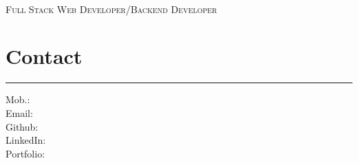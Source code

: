 \documentclass[]{rahulworld-resume}
\begin{document}
%
%

\begin{minipage}[t]{1\textwidth}
    \RaggedRight
    \begin{large}
    \end{large}\\
\textsc{Full Stack Web Developer/Backend Developer}


\end{minipage}

\begin{minipage}[t]{0.33\textwidth}



\vspace{5pt}
\section{Contact}
\noindent\rule{5cm}{0.4pt}

Mob.: \href{https://wa.me/573008163841}{}\\
Email: \textit{\href{mailto:janerrq@gmail.com}{}}\\
Github: \href{https://github.com/jamerrq}{} \\
LinkedIn: \href{https://www.linkedin.com/in/jamerrq}{} \\
Portfolio: \href{https://jamerrq-com.vercel.app/}{}

\end{minipage}
\end{document}
